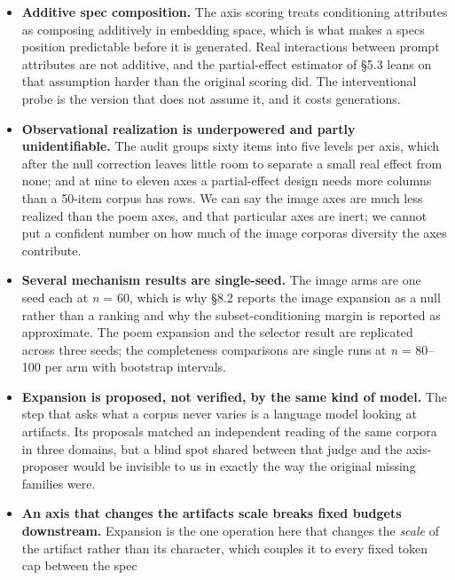 \documentclass[
  10pt,
]{article}
\theoremstyle{plain}
\theoremstyle{definition}
\begin{document}
\begin{itemize}
  human raters. The exam-item enemy radius is likewise adjudicated by a
  model under a psychometric rubric rather than by a credentialed
  psychometrician, and δ is specific to this embedder and this item
  type, with a bootstrap interval that includes zero.
\item
  \textbf{Additive spec composition.} The axis scoring treats
  conditioning attributes as composing additively in embedding space,
  which is what makes a spec\textquotesingle s position predictable
  before it is generated. Real interactions between prompt attributes
  are not additive, and the partial-effect estimator of §5.3 leans on
  that assumption harder than the original scoring did. The
  interventional probe is the version that does not assume it, and it
  costs generations.
\item
  \textbf{Observational realization is underpowered and partly
  unidentifiable.} The audit groups sixty items into five levels per
  axis, which after the null correction leaves little room to separate a
  small real effect from none; and at nine to eleven axes a
  partial-effect design needs more columns than a 50-item corpus has
  rows. We can say the image axes are much less realized than the poem
  axes, and that particular axes are inert; we cannot put a confident
  number on how much of the image corpora\textquotesingle s diversity
  the axes contribute.
\item
  \textbf{Several mechanism results are single-seed.} The image arms are
  one seed each at \emph{n} = 60, which is why §8.2 reports the image
  expansion as a null rather than a ranking and why the
  subset-conditioning margin is reported as approximate. The poem
  expansion and the selector result are replicated across three seeds;
  the completeness comparisons are single runs at \emph{n} = 80--100 per
  arm with bootstrap intervals.
\item
  \textbf{Expansion is proposed, not verified, by the same kind of
  model.} The step that asks what a corpus never varies is a language
  model looking at artifacts. Its proposals matched an independent
  reading of the same corpora in three domains, but a blind spot shared
  between that judge and the axis-proposer would be invisible to us in
  exactly the way the original missing families were.
\item
  \textbf{An axis that changes the artifact\textquotesingle s scale
  breaks fixed budgets downstream.} Expansion is the one operation here
  that changes the \emph{scale} of the artifact rather than its
  character, which couples it to every fixed token cap between the spec

\end{itemize}
\end{document}
